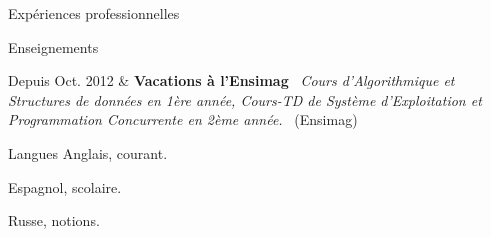 \documentclass{cv}
\newcommand{\lieu}[1]{{#1}\ }
\newcommand{\activite}[1]{\textbf{#1}\ }
\newcommand{\comment}[1]{\textsl{#1}\ }
\begin{document}
\begin{rubriquetableau}[2.6cm]{Expériences professionnelles}
\end{rubriquetableau}

\begin{rubriquetableau}[2.6cm]{Enseignements}
    
Depuis Oct. 2012 & \activite{Vacations à l'Ensimag}
	\comment{Cours d'Algorithmique et Structures de données en 1ère année, Cours-TD de Système d'Exploitation et Programmation Concurrente en 2ème année.}
        \lieu{(Ensimag)}\\
\end{rubriquetableau}


\begin{rubrique}{Langues} 
Anglais, courant.

Espagnol, scolaire.

Russe, notions.
\end{rubrique}
\end{document}
